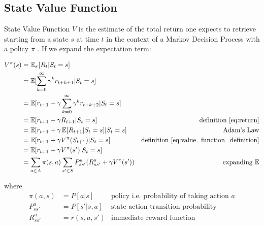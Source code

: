 
\subsection{State Value Function}
State Value Function $V$ is the estimate of the total return one expects to retrieve starting from a state $s$ at time $t$ in the context of a Markov Decision Process with a policy $\pi$ \cite{lecture_lets_go_markov}. If we expand the expectation term:
%      

\begin{align}
    V^{\pi}(s) &= \operatorname{\mathbb{E}}_{\pi}[R_{t} | S_t = s]  \label{eq:value_function_definition} \\
    &= \operatorname{\mathbb{E}}[\sum^{\infty}_{k=0} \gamma^k r_{t+k+1} | S_t = s] \nonumber \\
    &= \operatorname{\mathbb{E}}[r_{t+1} + \gamma \sum^{\infty}_{k=0} \gamma^k r_{t+k+2} | S_t = s] \nonumber \\
    &= \operatorname{\mathbb{E}}[r_{t+1} + \gamma R_{t+1} | S_t = s] & \text{definition \ref{eq:return}} \nonumber \\
    &= \operatorname{\mathbb{E}}[r_{t+1} + \gamma \operatorname{\mathbb{E}}[R_{t+1} | S_t = s] | S_t = s] & \text{Adam's Law} \nonumber \\
    &= \operatorname{\mathbb{E}}[r_{t+1} + \gamma V^{\pi}(S_{t+1}) | S_t = s] & \text{definition \ref{eq:value_function_definition}} \nonumber \\
    &= \operatorname{\mathbb{E}}[r_{t+1} + \gamma V^{\pi}(s') | S_t = s] \nonumber \\
    &= \sum_{a \in A} \pi(s, a) \sum_{s' \in S} P^{a}_{ss'} (R^{a}_{ss'} + \gamma V^{\pi}(s')) &\text{expanding $\operatorname{\mathbb{E}}$} \label{eq:mdp_value_function_expansion}
    \label{eq:value_function_def}
\end{align}

where 
\begin{align*}
    \pi(a, s) &= P[a|s] &\text{policy i.e. probability of taking action $a$}\\
    P^{a}_{ss'} &= P[s' | s, a] &\text{state-action transition probability}\\
    R^{a}_{ss'} &= r(s, a, s') &\text{immediate reward function}
\end{align*}

